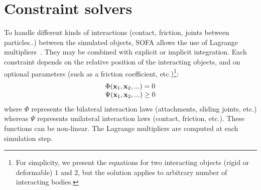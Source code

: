 
\section{Constraint solvers} 
\label{lm}
To handle different kinds of interactions (contact, friction, joints between particles..) between the simulated objects, SOFA allows the use of Lagrange multipliers~\cite{DDKA06}. 
They may be combined with explicit or implicit integration.
Each constraint depends on the relative position of the interacting objects, and on optional parameters 
(such as a friction coefficient, etc.)\footnote{For simplicity, we present the equations for two interacting objects 
(rigid or deformable) $1$ and $2$, but the solution applies to arbitrary number of interacting bodies.}:
\begin{equation}
\begin{array}{c}
\Phi(\mathbf{x }_1, \mathbf{x }_2, ...) = 0 \\ 
\Psi(\mathbf{x }_1, \mathbf{x }_2, ... ) \geq 0
\end{array}
\label{eq:constraints}
\end{equation} where $\Phi$ represents the bilateral interaction laws (attachments, sliding joints, etc.) whereas $\Psi$ represents unilateral interaction laws (contact, friction, etc.). These functions can be non-linear.
The Lagrange multipliers are computed at each simulation step.
